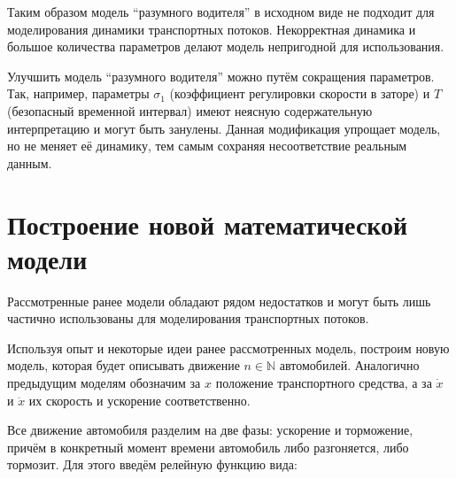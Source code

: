 \documentclass[12pt, a4paper]{extarticle}
\numberwithin{equation}{section}
\begin{document}
Таким образом модель ``разумного водителя'' в исходном виде не подходит для моделирования динамики транспортных потоков. Некорректная динамика и большое количества параметров делают модель непригодной для использования.

Улучшить модель ``разумного водителя'' можно путём сокращения параметров. Так, например, параметры $\sigma_1$ (коэффициент регулировки скорости в заторе) и $T$ (безопасный временной интервал) имеют неясную содержательную интерпретацию и могут быть занулены. Данная модификация упрощает модель, но не меняет её динамику, тем самым сохраняя несоответствие реальным данным.

\section{Построение новой математической модели}
Рассмотренные ранее модели обладают рядом недостатков и могут быть лишь частично использованы для моделирования транспортных потоков. 

Используя опыт и некоторые идеи ранее рассмотренных модель, построим новую модель, которая будет описывать движение $n \in \mathbb{N}$ автомобилей. Аналогично предыдущим моделям обозначим за $x$ положение транспортного средства, а за $\dot{x}$ и $\ddot{x}$ их скорость и ускорение соответственно. 

Все движение автомобиля разделим на две фазы: ускорение и торможение, причём в конкретный момент времени автомобиль либо разгоняется, либо тормозит. Для этого введём релейную функцию вида:
\end{document}

